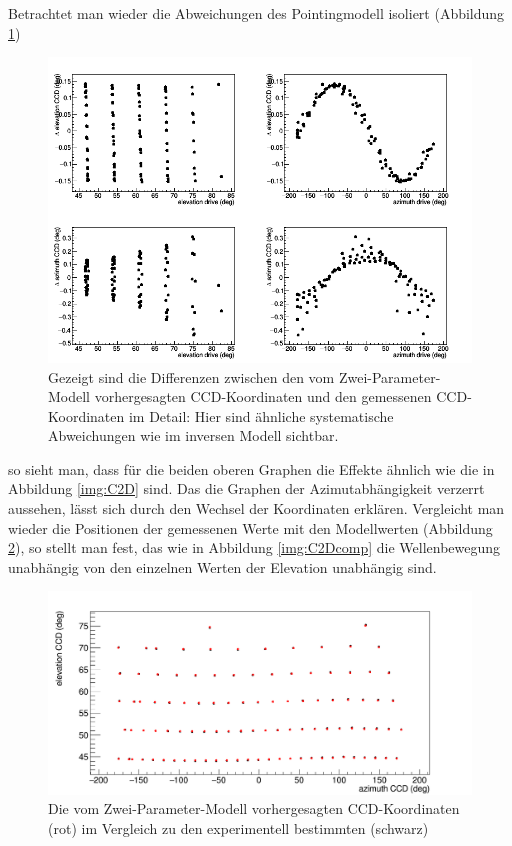 Betrachtet man wieder die Abweichungen des Pointingmodell isoliert (Abbildung \ref{img:D2C})
\begin{figure}[htbp]
\centering
\includegraphics[width=\textwidth]{../341/D2C.png}
\caption{Gezeigt sind die Differenzen zwischen den vom Zwei-Parameter-Modell vorhergesagten CCD-Koordinaten und den gemessenen CCD-Koordinaten  im Detail: Hier sind ähnliche systematische Abweichungen wie im inversen Modell sichtbar.}
\label{img:D2C}
\end{figure}
so sieht man, dass für die beiden oberen Graphen die Effekte ähnlich wie die in Abbildung \ref{img:C2D} sind. Das die Graphen der Azimutabhängigkeit verzerrt aussehen, lässt sich durch den Wechsel der Koordinaten erklären. Vergleicht man wieder die Positionen der gemessenen Werte mit den Modellwerten (Abbildung \ref{img:D2Ccomp2}), so stellt man fest, das wie in Abbildung \ref{img:C2Dcomp} die Wellenbewegung unabhängig von den einzelnen Werten der Elevation unabhängig sind.
\begin{figure}[htbp]
\centering
\includegraphics[width=\textwidth]{../341/D2Ccomp2.png}
\caption{Die vom Zwei-Parameter-Modell vorhergesagten CCD-Koordinaten (rot) im Vergleich zu den experimentell bestimmten (schwarz)}
\label{img:D2Ccomp2}
\end{figure}

